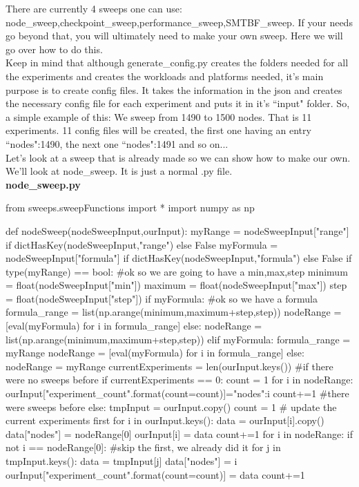 \documentclass[titlepage]{article}
\makeatletter
\renewcommand\paragraph{\@startsection{paragraph}{4}{\z@}{-3.25ex \@plus1ex \@minus.2ex}{10pt}{\sffamily\normalsize\bfseries}}
\makeatother
\begin{document}
\hypertarget{sweep_module}{}
\paragraph{Make a sweep module}
There are currently 4 sweeps one can use: node\_sweep,checkpoint\_sweep,performance\_sweep,SMTBF\_sweep.
If your needs go beyond that, you will ultimately need to make your own sweep.
Here we will go over how to do this.\\

Keep in mind that although generate\_config.py creates the folders needed for all the
experiments and creates the workloads and platforms needed, it's main purpose is to create config files.  It takes the information in the json
and creates the necessary config file for each experiment and puts it in it's ``input" folder.  So, a simple example of this:
We sweep from 1490 to 1500 nodes.  That is 11 experiments. 11 config files will be created, the first one having an entry ``nodes":1490,
the next one ``nodes":1491  and so on... \\

Let's look at a sweep that is already made so we can show how to make our own.
We'll look at node\_sweep.  It is just a normal .py file.\\
\textbf{node\_sweep.py}
\begin{code}
from sweeps.sweepFunctions import *
import numpy as np

def nodeSweep(nodeSweepInput,ourInput):
    myRange = nodeSweepInput["range"] if dictHasKey(nodeSweepInput,"range") else False
    myFormula = nodeSweepInput["formula"] if dictHasKey(nodeSweepInput,"formula") else False
    if type(myRange) == bool:
        #ok so we are going to have a min,max,step
        minimum = float(nodeSweepInput["min"])
        maximum = float(nodeSweepInput["max"])
        step = float(nodeSweepInput["step"])
        if myFormula:
            #ok so we have a formula
            formula_range = list(np.arange(minimum,maximum+step,step))
            nodeRange = [eval(myFormula) for i in formula_range]
        else:
            nodeRange = list(np.arange(minimum,maximum+step,step))
    elif myFormula:
        formula_range = myRange
        nodeRange = [eval(myFormula) for i in formula_range]
    else:
        nodeRange = myRange
    currentExperiments = len(ourInput.keys())
    #if there were no sweeps before  
    if currentExperiments == 0: 
        count = 1
        for i in nodeRange:
            ourInput["experiment_{count}".format(count=count)]={"nodes":i}
            count+=1
    #there were sweeps before
    else:
        tmpInput = ourInput.copy()
        count = 1
        # update the current experiments first
        for i in ourInput.keys():
            data = ourInput[i].copy()
            data["nodes"] = nodeRange[0]
            ourInput[i] = data
            count+=1
        for i in nodeRange:
            if not i == nodeRange[0]:  #skip the first, we already did it
                for j in tmpInput.keys():
                    data = tmpInput[j]
                    data["nodes"] = i
                    ourInput["experiment_{count}".format(count=count)] = data
                    count+=1

\end{code}
\end{document}
